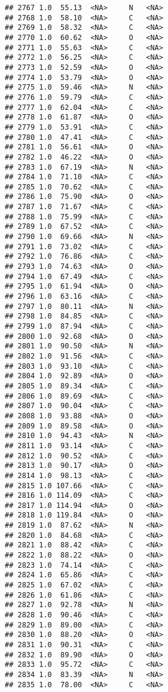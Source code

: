 \documentclass[
]{article}
\begin{document}
\begin{verbatim}
## 2767 1.0  55.13  <NA>     N   <NA>
## 2768 1.0  58.10  <NA>     C   <NA>
## 2769 1.0  58.32  <NA>     C   <NA>
## 2770 1.0  60.62  <NA>     O   <NA>
## 2771 1.0  55.63  <NA>     C   <NA>
## 2772 1.0  56.25  <NA>     C   <NA>
## 2773 1.0  52.59  <NA>     O   <NA>
## 2774 1.0  53.79  <NA>     O   <NA>
## 2775 1.0  59.46  <NA>     N   <NA>
## 2776 1.0  59.79  <NA>     C   <NA>
## 2777 1.0  62.04  <NA>     C   <NA>
## 2778 1.0  61.87  <NA>     O   <NA>
## 2779 1.0  53.91  <NA>     C   <NA>
## 2780 1.0  47.41  <NA>     C   <NA>
## 2781 1.0  56.61  <NA>     O   <NA>
## 2782 1.0  46.22  <NA>     O   <NA>
## 2783 1.0  67.19  <NA>     N   <NA>
## 2784 1.0  71.10  <NA>     C   <NA>
## 2785 1.0  70.62  <NA>     C   <NA>
## 2786 1.0  75.90  <NA>     O   <NA>
## 2787 1.0  71.67  <NA>     C   <NA>
## 2788 1.0  75.99  <NA>     C   <NA>
## 2789 1.0  67.52  <NA>     C   <NA>
## 2790 1.0  69.66  <NA>     N   <NA>
## 2791 1.0  73.02  <NA>     C   <NA>
## 2792 1.0  76.86  <NA>     C   <NA>
## 2793 1.0  74.63  <NA>     O   <NA>
## 2794 1.0  67.49  <NA>     C   <NA>
## 2795 1.0  61.94  <NA>     O   <NA>
## 2796 1.0  63.16  <NA>     C   <NA>
## 2797 1.0  80.11  <NA>     N   <NA>
## 2798 1.0  84.85  <NA>     C   <NA>
## 2799 1.0  87.94  <NA>     C   <NA>
## 2800 1.0  92.68  <NA>     O   <NA>
## 2801 1.0  90.50  <NA>     N   <NA>
## 2802 1.0  91.56  <NA>     C   <NA>
## 2803 1.0  93.10  <NA>     C   <NA>
## 2804 1.0  92.89  <NA>     O   <NA>
## 2805 1.0  89.34  <NA>     C   <NA>
## 2806 1.0  89.69  <NA>     C   <NA>
## 2807 1.0  90.04  <NA>     C   <NA>
## 2808 1.0  93.88  <NA>     O   <NA>
## 2809 1.0  89.58  <NA>     O   <NA>
## 2810 1.0  94.43  <NA>     N   <NA>
## 2811 1.0  93.14  <NA>     C   <NA>
## 2812 1.0  90.52  <NA>     C   <NA>
## 2813 1.0  90.17  <NA>     O   <NA>
## 2814 1.0  98.13  <NA>     C   <NA>
## 2815 1.0 107.66  <NA>     C   <NA>
## 2816 1.0 114.09  <NA>     C   <NA>
## 2817 1.0 114.94  <NA>     O   <NA>
## 2818 1.0 119.84  <NA>     O   <NA>
## 2819 1.0  87.62  <NA>     N   <NA>
## 2820 1.0  84.68  <NA>     C   <NA>
## 2821 1.0  88.42  <NA>     C   <NA>
## 2822 1.0  88.22  <NA>     O   <NA>
## 2823 1.0  74.14  <NA>     C   <NA>
## 2824 1.0  65.86  <NA>     C   <NA>
## 2825 1.0  67.02  <NA>     C   <NA>
## 2826 1.0  61.86  <NA>     C   <NA>
## 2827 1.0  92.78  <NA>     N   <NA>
## 2828 1.0  90.46  <NA>     C   <NA>
## 2829 1.0  89.00  <NA>     C   <NA>
## 2830 1.0  88.20  <NA>     O   <NA>
## 2831 1.0  90.31  <NA>     C   <NA>
## 2832 1.0  89.90  <NA>     O   <NA>
## 2833 1.0  95.72  <NA>     C   <NA>
## 2834 1.0  83.39  <NA>     N   <NA>
## 2835 1.0  78.00  <NA>     C   <NA>

\end{verbatim}
\end{document}

